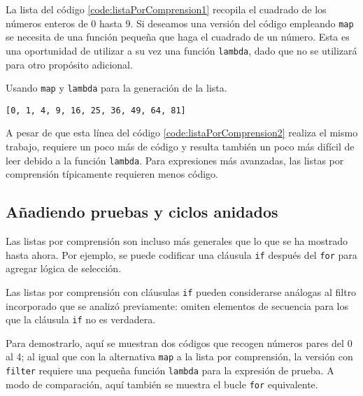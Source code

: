 La lista del código \ref{code:listaPorComprension1} recopila el cuadrado de los números enteros de 0 hasta 9. Si
deseamos una versión del código empleando \texttt{map} se necesita de
una función pequeña que haga el cuadrado de un número. Esta es una
oportunidad de utilizar a su vez una función \texttt{lambda}, dado que
no se utilizará para otro propósito adicional.\\

\begin{code} Usando \texttt{map} y \texttt{lambda} para la generación de la lista.

\begin{Shaded}
\begin{Highlighting}[]
\NormalTok{(}\NormalTok{(}\OperatorTok{**}\NormalTok{, }\NormalTok{(}\NormalTok{)))}
\end{Highlighting}
\end{Shaded}

\begin{verbatim}
[0, 1, 4, 9, 16, 25, 36, 49, 64, 81]
\end{verbatim}
\label{code:listaPorComprension2}
\end{code}

A pesar de que esta línea del código \ref{code:listaPorComprension2} realiza el mismo trabajo, requiere un poco más
de código y resulta también un poco más difícil de leer debido a la
función \texttt{lambda}. Para expresiones más avanzadas, las listas por
comprensión típicamente requieren menos código.

\subsection{Añadiendo pruebas y ciclos anidados}

Las listas por comprensión son incluso más generales que lo que se ha
mostrado hasta ahora. Por ejemplo, se puede codificar una cláusula
\texttt{if} después del \texttt{for} para agregar lógica de selección.

Las listas por comprensión con cláusulas \texttt{if} pueden considerarse
análogas al filtro incorporado que se analizó previamente: omiten
elementos de secuencia para los que la cláusula \texttt{if} no es
verdadera.

Para demostrarlo, aquí se muestran dos códigos que recogen números pares
del 0 al 4; al igual que con la alternativa \texttt{map} a la lista por
comprensión, la versión con \texttt{filter} requiere una pequeña función
\texttt{lambda} para la expresión de prueba. A modo de comparación, aquí
también se muestra el bucle \texttt{for} equivalente. \\

